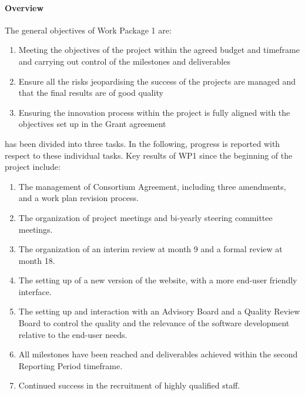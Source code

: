 
\paragraph{Overview}

The general objectives of Work Package 1 are:

\begin{enumerate}
\item{Meeting the objectives of the project within the agreed budget and timeframe and carrying out control of the milestones and deliverables}
\item{Ensure all the risks jeopardising the success of the projects are managed and that the final results are of good quality}
\item{Ensuring the innovation process within the project is fully aligned with the objectives set up in the Grant agreement}
\end{enumerate}

 has been divided into three tasks. In the following, progress is reported with respect to these individual tasks.
Key results of WP1 since the beginning of the project include:
\begin{enumerate}
\item The management of Consortium Agreement, including three
  amendments, and a work plan revision process.
\item The organization of project meetings and bi-yearly steering
  committee meetings.
\item The organization of an interim review at month 9 and a formal
  review at month 18.
\item The setting up of a new version of the \ODK website, with a more end-user friendly interface.
\item The setting up and interaction with an Advisory Board and a
  Quality Review Board to control the quality and the relevance of the
  software development relative to the end-user needs.
\item All milestones have been reached and deliverables achieved within the second Reporting Period timeframe.
\item Continued success in the recruitment of highly qualified staff.
\end{enumerate}

